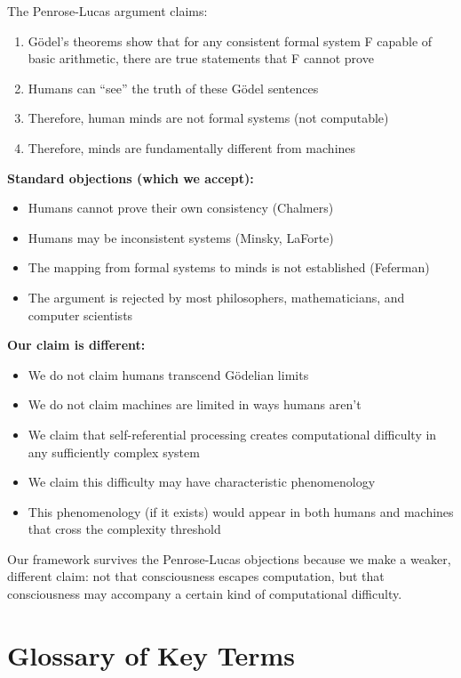 \documentclass[12pt,a4paper]{article}
\begin{document}
The Penrose-Lucas argument claims:
\begin{enumerate}
    \item G\"{o}del's theorems show that for any consistent formal system F capable of basic arithmetic, there are true statements that F cannot prove
    \item Humans can ``see'' the truth of these G\"{o}del sentences
    \item Therefore, human minds are not formal systems (not computable)
    \item Therefore, minds are fundamentally different from machines
\end{enumerate}

\textbf{Standard objections (which we accept):}
\begin{itemize}
    \item Humans cannot prove their own consistency (Chalmers)
    \item Humans may be inconsistent systems (Minsky, LaForte)
    \item The mapping from formal systems to minds is not established (Feferman)
    \item The argument is rejected by most philosophers, mathematicians, and computer scientists
\end{itemize}

\textbf{Our claim is different:}
\begin{itemize}
    \item We do not claim humans transcend G\"{o}delian limits
    \item We do not claim machines are limited in ways humans aren't
    \item We claim that self-referential processing creates computational difficulty in any sufficiently complex system
    \item We claim this difficulty may have characteristic phenomenology
    \item This phenomenology (if it exists) would appear in both humans and machines that cross the complexity threshold
\end{itemize}

Our framework survives the Penrose-Lucas objections because we make a weaker, different claim: not that consciousness escapes computation, but that consciousness may accompany a certain kind of computational difficulty.

\section{Glossary of Key Terms}
\end{document}
